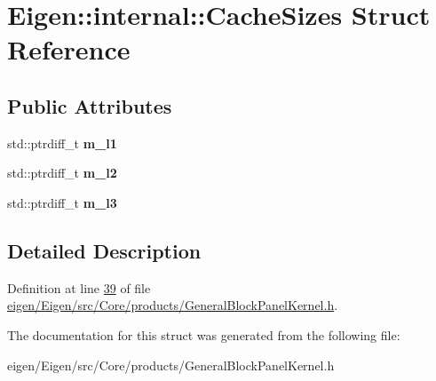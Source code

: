 \hypertarget{struct_eigen_1_1internal_1_1_cache_sizes}{}\section{Eigen\+:\+:internal\+:\+:Cache\+Sizes Struct Reference}
\label{struct_eigen_1_1internal_1_1_cache_sizes}
\subsection*{Public Attributes}
\begin{DoxyCompactItemize}
\item 
\mbox{\label{struct_eigen_1_1internal_1_1_cache_sizes_a2e40c5b1a5c224871d46bd8daf02bbf3}} 
std\+::ptrdiff\+\_\+t {\bfseries m\+\_\+l1}
\item 
\mbox{\label{struct_eigen_1_1internal_1_1_cache_sizes_aca8d9973df4c91cd3a9de81221a0b2d5}} 
std\+::ptrdiff\+\_\+t {\bfseries m\+\_\+l2}
\item 
\mbox{\label{struct_eigen_1_1internal_1_1_cache_sizes_af9ff1e9bc970c01499cf20974d0e8082}} 
std\+::ptrdiff\+\_\+t {\bfseries m\+\_\+l3}
\end{DoxyCompactItemize}


\subsection{Detailed Description}


Definition at line \hyperlink{eigen_2_eigen_2src_2_core_2products_2_general_block_panel_kernel_8h_source_l00039}{39} of file \hyperlink{eigen_2_eigen_2src_2_core_2products_2_general_block_panel_kernel_8h_source}{eigen/\+Eigen/src/\+Core/products/\+General\+Block\+Panel\+Kernel.\+h}.



The documentation for this struct was generated from the following file\+:\begin{DoxyCompactItemize}
\item 
eigen/\+Eigen/src/\+Core/products/\+General\+Block\+Panel\+Kernel.\+h\end{DoxyCompactItemize}

